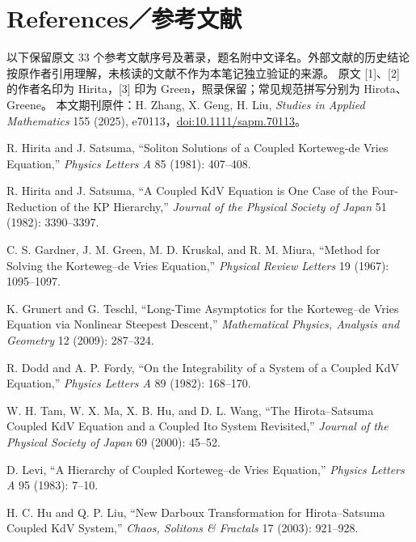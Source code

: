 \chapter*{References／参考文献}
\begin{note}
以下保留原文 33 个参考文献序号及著录，题名附中文译名。外部文献的历史结论按原作者引用理解，未核读的文献不作为本笔记独立验证的来源。
原文 [1]、[2] 的作者名印为 Hirita，[3] 印为 Green，照录保留；常见规范拼写分别为 Hirota、Greene。
本文期刊原件：H. Zhang, X. Geng, H. Liu, \emph{Studies in Applied Mathematics} 155 (2025), e70113，\href{https://doi.org/10.1111/sapm.70113}{doi:10.1111/sapm.70113}。
\end{note}
\begin{enumerate}[label={[\arabic*]},leftmargin=2.8em]
\item R. Hirita and J. Satsuma, ``Soliton Solutions of a Coupled Korteweg-de Vries Equation,'' \emph{Physics Letters A} 85 (1981): 407--408.
\item R. Hirita and J. Satsuma, ``A Coupled KdV Equation is One Case of the Four-Reduction of the KP Hierarchy,'' \emph{Journal of the Physical Society of Japan} 51 (1982): 3390--3397.
\item C. S. Gardner, J. M. Green, M. D. Kruskal, and R. M. Miura, ``Method for Solving the Korteweg--de Vries Equation,'' \emph{Physical Review Letters} 19 (1967): 1095--1097.
\item K. Grunert and G. Teschl, ``Long-Time Asymptotics for the Korteweg--de Vries Equation via Nonlinear Steepest Descent,'' \emph{Mathematical Physics, Analysis and Geometry} 12 (2009): 287--324.
\item R. Dodd and A. P. Fordy, ``On the Integrability of a System of a Coupled KdV Equation,'' \emph{Physics Letters A} 89 (1982): 168--170.
\item W. H. Tam, W. X. Ma, X. B. Hu, and D. L. Wang, ``The Hirota--Satsuma Coupled KdV Equation and a Coupled Ito System Revisited,'' \emph{Journal of the Physical Society of Japan} 69 (2000): 45--52.
\item D. Levi, ``A Hierarchy of Coupled Korteweg--de Vries Equation,'' \emph{Physics Letters A} 95 (1983): 7--10.
\item H. C. Hu and Q. P. Liu, ``New Darboux Transformation for Hirota--Satsuma Coupled KdV System,'' \emph{Chaos, Solitons \& Fractals} 17 (2003): 921--928.

\end{enumerate}
